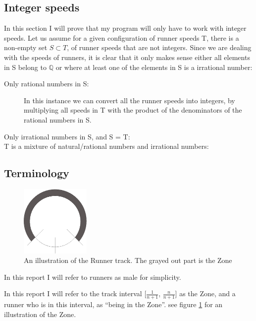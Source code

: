 \subsection{Integer speeds}
\label{integerSpeeds}
In this section I will prove that my program will only have to work with integer speeds.
Let us assume for a given configuration of runner speeds T, there is a non-empty set $S \subset T$, of runner speeds that are not integers. Since we are dealing with the speeds of runners, it is clear that it only makes sense either all elements in S belong to $\mathbb{Q}$ or where at least one of the elements in S is a irrational number:
\begin{description}
\item[Only rational numbers in S:] In this instance we can convert all the runner speeds into integers, by multiplying all speeds in T with the product of the denominators of the rational numbers in S.
\item[Only irrational numbers in S, and S = T:]

\item[T is a mixture of natural/rational numbers and irrational numbers:]

\end{description}

\subsection{Terminology}
\label{Termonolgy}
\begin{figure}[H]
  \centering
  \includegraphics[width=0.3\textwidth, angle=90]{./images/circleZoneEPS}
  \caption{\label{circleZoneImg}An illustration of the Runner track. The grayed out part is the Zone}
\end{figure}

In this report I will refer to runners as male for simplicity.

\begin{defi}
\label{def:theZone}
In this report I will refer to the track interval [$\frac{1}{n + 1}$, $\frac{n}{n+1}$] as the Zone, and a runner who is in this interval, as ``being in the Zone''. see figure \ref{circleZoneImg} for an illustration of the Zone.
\end{defi}

